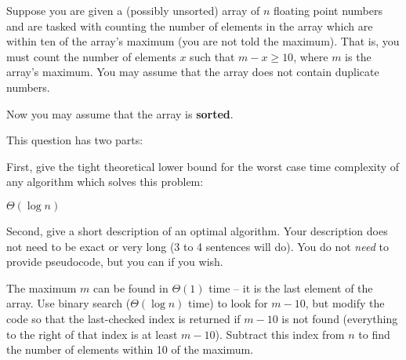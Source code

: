 \begin{prob}
    Suppose you are given a (possibly unsorted) array of $n$ floating point numbers and are tasked with counting the number
    of elements in the array which are within ten of the array's maximum (you are not told the maximum).
    That is, you must count the number of elements $x$ such that $m - x \geq 10$, where $m$ is the array's
    maximum. You may assume that the array does not contain duplicate numbers.

    Now you may assume that the array is \textbf{sorted}.

    This question has two parts:

    First, give the tight theoretical lower bound for the worst case
    time complexity of any algorithm which solves this problem:

    \begin{soln}
        $\Theta(\log n)$
    \end{soln}

    Second, give a short description of an optimal algorithm.
    Your description does not need to be exact or very long (3 to 4 sentences will do).
    You do not \textit{need} to provide pseudocode, but you can if you wish.

    \begin{soln}
        The maximum $m$ can be found in $\Theta(1)$ time -- it is the last element of the array.
        Use binary search ($\Theta(\log n)$ time) to look for $m - 10$, but
        modify the code so that the last-checked index is returned if $m -
        10$ is not found (everything to the right of that index is at least
        $m - 10$). Subtract this index from $n$ to find the number of
        elements within 10 of the maximum.
    \end{soln}
\end{prob}
